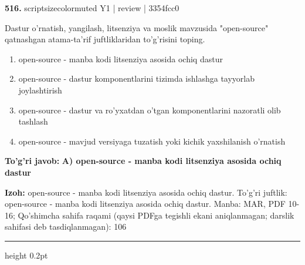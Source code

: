 \documentclass[10pt,a4paper]{article}
\begin{document}
{\bfseries\sffamily\color{ink} 516.} {scriptsizecolor{muted} Y1 | review | 3354fcc0}
\par
Dastur o'rnatish, yangilash, litsenziya va moslik mavzusida "open-source" qatnashgan atama-ta'rif juftliklaridan to'g'risini toping.
\begin{enumerate}[label=\Alph*),leftmargin=9mm]
\item open-source - manba kodi litsenziya asosida ochiq dastur
\item open-source - dastur komponentlarini tizimda ishlashga tayyorlab joylashtirish
\item open-source - dastur va ro'yxatdan o'tgan komponentlarini nazoratli olib tashlash
\item open-source - mavjud versiyaga tuzatish yoki kichik yaxshilanish o'rnatish
\end{enumerate}
\begin{tcolorbox}[enhanced,breakable,colback=teal!4,colframe=teal!60!black,boxrule=0.45pt,arc=1.2mm,left=2.7mm,right=2.7mm,top=1.8mm,bottom=1.8mm,before skip=2mm,after skip=2mm]
{\bfseries\sffamily\color{teal}To'g'ri javob:} \textbf{A) open-source - manba kodi litsenziya asosida ochiq dastur}
\par\smallskip
{\bfseries Izoh:} open-source - manba kodi litsenziya asosida ochiq dastur. To'g'ri juftlik: open-source - manba kodi litsenziya asosida ochiq dastur. Manba: MAR, PDF 10-16; Qo'shimcha sahifa raqami (qaysi PDFga tegishli ekani aniqlanmagan; darslik sahifasi deb tasdiqlanmagan): 106
\end{tcolorbox}
\vspace{2mm}\hrule height 0.2pt\vspace{3mm}
\end{document}
